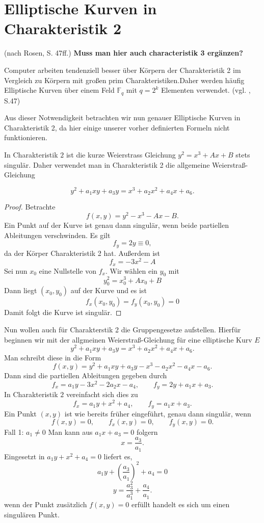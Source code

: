 \begin{bemerkung}

\end{bemerkung}

\section{Elliptische Kurven in Charakteristik 2} (nach Rosen, S. 47ff.) \textbf{Muss man hier auch characteristik 3 ergänzen?}

Computer arbeiten tendenziell besser über Körpern der Charakteristik 2 im Vergleich zu Körpern mit großen prim Charakteristiken.Daher werden häufig Elliptische Kurven über einem Feld $\mathbb{F}_q$ mit $q=2^k$ Elementen verwendet.
(vgl. \cite{silverman06}, S.47)

Aus dieser Notwendigkeit betrachten wir nun genauer Elliptische Kurven in Charakteristik 2, da hier einige unserer vorher definierten Formeln nicht funktionieren.\\
\begin{satz}
    In Charakteristik \(2\) ist die kurze Weierstrass Gleichung \(y^2=x^3+Ax+B\) stets singulär. Daher verwendet man in Charakteristik 2 die allgemeine Weierstraß-Gleichung
\end{satz}

\[
    y^2+a_1xy+a_3y=x^3+a_2x^2+a_4x+a_6.
\]
\begin{proof}
    Betrachte
    \[
        f(x,y) = y^2-x^3-Ax-B.
    \]
    Ein Punkt auf der Kurve ist genau dann singulär, wenn beide partiellen Ableitungen verschwinden. Es gilt
    \[
        f_y=2y\equiv0,
    \] da der Körper Charakteristik 2 hat. Außerdem ist
    \[
        f_x=-3x^2-A
    \]
    Sei nun $x_0$ eine Nullstelle von $f_x$. Wir wählen ein \(y_0\) mit
    \[
        y_0^2=x_0^3+Ax_0+B
    \]
    Dann liegt $(x_0,y_0)$ auf der Kurve und es ist
    \[
        f_x(x_0,y_0)=f_y(x_0,y_0) = 0
    \]
    Damit folgt die Kurve ist singulär.
\end{proof}

Nun wollen auch für Charakterstik 2 die Gruppengesetze aufstellen.
Hierfür beginnen wir mit der allgmeinen Weierstraß-Gleichung für eine elliptische Kurv $E$
\[
    y^2+a_1xy+a_3y=x^3+a_2x^2+a_4x+a_6.
\]
Man schreibt diese in die Form
\[
    f(x,y)=y^2+a_1xy+a_3y-x^3-a_2x^2-a_4x-a_6.
\]
Dann sind die partiellen Ableitungen gegeben durch
\[
    f_x=a_1y-3x^2-2a_2x-a_4,\qquad f_y=2y+a_1x+a_3.
\]
In Charakteristik \(2\) vereinfacht sich dies zu
\[
    f_x=a_1y+x^2+a_4,\qquad f_y=a_1x+a_3.
\]
Ein Punkt \((x,y)\) ist wie bereits früher eingeführt, genau dann singulär, wenn
\[
    f(x,y)=0,\qquad f_x(x,y)=0,\qquad f_y(x,y)=0.
\]
Fall 1: $a_1\neq 0$
Man kann aus \(a_1x+a_3=0\) folgern
\[
    x=\frac{a_3}{a_1}.
\]
Eingesetzt in \(a_1y+x^2+a_4=0\) liefert es,
\[
    a_1y+\left(\frac{a_3}{a_1}\right)^2+a_4=0
\]
\[
    y= \frac{a_3^2}{a_1^3}+ \frac{a_4}{a_1}.
\]
wenn der Punkt zusätzlich \(f(x,y)=0\) erfüllt handelt es sich um einen singulären Punkt.

